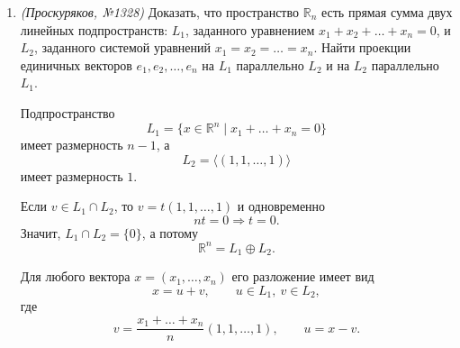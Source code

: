 \begin{enumerate}
Из второй строки получаем $\beta_1=2$.
Из четвёртой строки:
\[
\alpha_2+\beta_1-\beta_2=0 \quad\Rightarrow\quad \alpha_2-\beta_2=-2.
\]
Из третьей строки:
\[
-\alpha_2-2\beta_2=2 \quad\Rightarrow\quad \alpha_2+2\beta_2=-2.
\]
Вычитая, получаем $\beta_2=0$, откуда $\alpha_2=-2$.
Из первой строки:
\[
\alpha_1+\alpha_2+\beta_1+\beta_2=0 \quad\Rightarrow\quad \alpha_1=0.
\]

Значит,
\[
\operatorname{pr}_{L_1}^{L_2}x=\alpha_1 a_1+\alpha_2 a_2
=-2\begin{pmatrix}1\\1\\0\\1\end{pmatrix}
=\begin{pmatrix}-2\\-2\\0\\-2\end{pmatrix},
\]
\[
\operatorname{pr}_{L_2}^{L_1}x=\beta_1 b_1+\beta_2 b_2
=2\begin{pmatrix}1\\0\\1\\1\end{pmatrix}
=\begin{pmatrix}2\\0\\2\\2\end{pmatrix}.
\]

\item \textit{(Проскуряков, №1328)} Доказать, что пространство $\mathbb{R}_n$ есть прямая сумма двух линейных подпространств: $L_1$, заданного уравнением $x_1 + x_2 + \dots + x_n = 0$, и $L_2$, заданного системой уравнений $x_1 = x_2 = \dots = x_n$. Найти проекции единичных векторов $e_1, e_2, \dots, e_n$ на $L_1$ параллельно $L_2$ и на $L_2$ параллельно $L_1$.

Подпространство
\[
L_1=\{x\in\mathbb R^n\mid x_1+\dots+x_n=0\}
\]
имеет размерность $n-1$, а
\[
L_2=\langle(1,1,\dots,1)\rangle
\]
имеет размерность $1$.

Если $v\in L_1\cap L_2$, то $v=t(1,1,\dots,1)$ и одновременно
\[
nt=0 \Rightarrow t=0.
\]
Значит, $L_1\cap L_2=\{0\}$, а потому
\[
\mathbb R^n=L_1\oplus L_2.
\]

Для любого вектора $x=(x_1,\dots,x_n)$ его разложение имеет вид
\[
x=u+v,
\qquad u\in L_1,\ v\in L_2,
\]
где
\[
v=\frac{x_1+\dots+x_n}{n}(1,1,\dots,1),
\qquad
u=x-v.
\]


\end{enumerate}
